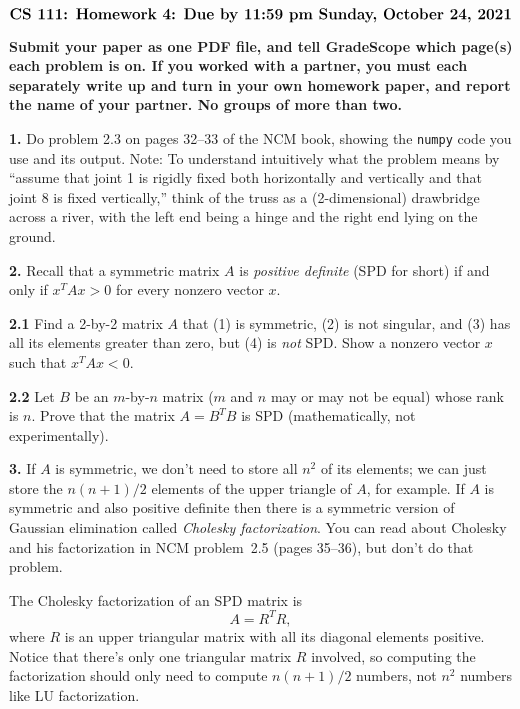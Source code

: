 \documentclass[11pt]{article}
\begin{document}
$$\mbox{\Large \bf CS 111: Homework 4: Due by 11:59 pm Sunday, October 24, 2021}$$
\par\smallskip\noindent
{\bf Submit your paper as one PDF file,
and tell GradeScope which page(s) each problem is on.
If you worked with a partner, 
you must each separately write up and turn in your own homework paper, 
and report the name of your partner.
No groups of more than two.
}

\par\bigskip
{\bf 1.}
Do problem 2.3 on pages 32--33 of the NCM book, 
showing the {\tt numpy} code you use and its output. 
Note: To understand intuitively what the problem means by 
``assume that joint 1 is rigidly fixed both horizontally and vertically 
and that joint 8 is fixed vertically,'' 
think of the truss as a (2-dimensional) drawbridge across a river, 
with the left end being a hinge and the right end lying on the ground.


\par\bigskip
{\bf 2.} Recall that a symmetric matrix $A$ is {\em positive definite}
(SPD for short) if and only if $x^TAx>0$ for every nonzero vector $x$.

\par\medskip
{\bf 2.1} Find a 2-by-2 matrix $A$ that (1) is symmetric, (2) is not singular,
and (3) has all its elements greater than zero, but (4) is {\em not} SPD.
Show a nonzero vector $x$ such that $x^TAx<0$.

\par\medskip
{\bf 2.2} Let $B$ be an $m$-by-$n$ matrix ($m$ and $n$ may or may not be equal) 
whose rank is $n$.
Prove that the matrix $A=B^TB$ is SPD (mathematically, not experimentally).

\par\bigskip
{\bf 3.} 
If $A$ is symmetric, we don't need to store all $n^2$ of its elements; 
we can just store the $n(n+1)/2$ elements of the upper triangle of $A$, for example.
If $A$ is symmetric and also positive definite then there is a symmetric
version of Gaussian elimination called {\em Cholesky factorization}.
You can read about Cholesky and his factorization in NCM problem~2.5 (pages 35--36),
but don't do that problem. 

The Cholesky factorization of an SPD matrix is
$$A = R^TR,$$
where $R$ is an upper triangular matrix with all its diagonal elements positive.
Notice that there's only one triangular matrix $R$ involved, so computing
the factorization should only need to compute $n(n+1)/2$ numbers, 
not $n^2$ numbers like LU factorization.
\end{document}
